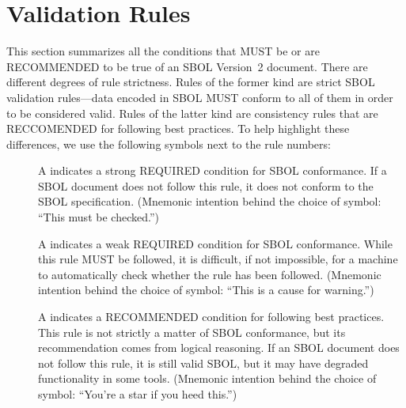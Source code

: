 \newcommand{\printValid}{\validRule{sbol-\arabic{sbolCtr}\addtocounter{sbolCtr}{1}}}
\newcommand{\printWarning}{\consistencyRule{sbol-\arabic{sbolCtr}\addtocounter{sbolCtr}{1}}}
\newcommand{\printModeling}{\modelingRule{sbol-\arabic{sbolCtr}\addtocounter{sbolCtr}{1}}}

\section{Validation Rules}
\label{validation}

This section summarizes all the conditions that MUST be or 
are RECOMMENDED to be true of an SBOL Version~2 document.  
There are different degrees of rule strictness.  
Rules of the former kind are strict SBOL validation rules---data encoded in SBOL MUST conform to
all of them in order to be considered valid.  Rules of the latter kind
are consistency rules that are RECCOMENDED for following best practices.  To help highlight these differences, we use the
following symbols next to the rule numbers:

\begin{description}

\item[\hspace*{6.5pt}\vSymbol\vsp] A \vSymbolName indicates a strong
  REQUIRED condition for SBOL conformance. If a SBOL document does not follow this rule, it does not conform to the SBOL
  specification.  (Mnemonic intention behind the choice of symbol:
  ``This must be checked.'')

\item[\hspace*{6.5pt}\cSymbol\csp] A \cSymbolName indicates a weak
  REQUIRED condition for SBOL conformance. While this rule MUST be followed, it is difficult, if not  impossible, for a machine to automatically check whether the rule has been followed. (Mnemonic intention behind the choice of symbol: ``This is a cause for warning.'')

\item[\hspace*{6.5pt}\mSymbol\msp] A \mSymbolName indicates a 
  RECOMMENDED condition for following best practices.  This rule is not strictly a matter of SBOL conformance, but its recommendation comes from logical
  reasoning.  If an SBOL document does not follow this rule, it is still valid SBOL, but it may have degraded functionality in some tools.  (Mnemonic intention behind the choice of symbol: ``You're a star if you heed this.'')

\end{description}

